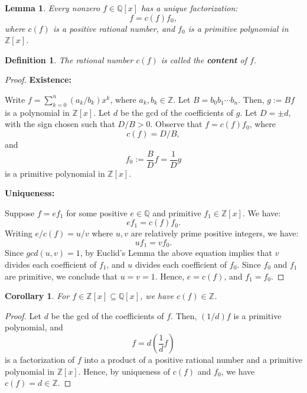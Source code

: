 \documentclass[a4paper,12pt]{report}
\newcounter{statement}
\numberwithin{statement}{chapter}
\newtheorem{defn}[statement]{Definition}
\newtheorem{lemma}[statement]{Lemma}
\newtheorem{cor}[statement]{Corollary}
\numberwithin{equation}{chapter}
\numberwithin{section}{chapter}
\numberwithin{subsection}{section}
\begin{document}
\begin{lemma}
Every nonzero $f \in \mathbb{Q}[x]$ has a unique factorization:
\[
f = c(f) f_0,
\]
where $c(f)$ is a positive rational number, and $f_0$ is a primitive polynomial in $\mathbb{Z}[x]$.
\end{lemma}
\begin{defn}

The rational number $c(f)$ is called the  {\bf content}  of $f$.

\end{defn}
\begin{proof}

 {\bf Existence:} 

Write $f = \sum_{k = 0}^n (a_k/b_k)x^k$,
where $a_k, b_k \in \mathbb{Z}$.
Let $B = b_0b_1\cdots b_n$.
Then, $g := Bf$ is a polynomial in $\mathbb{Z}[x]$.
Let $d$ be the gcd of the coefficients of $g$.
Let $D = \pm d$, with the sign chosen such that $D/B > 0$.
Observe that $f = c(f)f_0$, where
\[
c(f) = D/B,
\]
and
\[
f_0 := \frac{B}{D} f = \frac{1}{D}g
\]
is a primitive polynomial in $\mathbb{Z}[x]$.


 {\bf Uniqueness:} 

Suppose $f = ef_1$ for some positive $e \in \mathbb{Q}$ and primitive $f_1 \in \mathbb{Z}[x]$.
We have:
\[
ef_1 = c(f) f_0.
\]
Writing $e/c(f) = u/v$ where $u, v$ are relatively prime positive integers, we have:
\[
uf_1 = vf_0.
\]
Since $gcd(u, v) = 1$, by Euclid's Lemma the above equation implies that $v$ divides each
coefficient of $f_1$, and $u$ divides each coefficient of $f_0$.
Since $f_0$ and $f_1$ are primitive, we conclude that $u = v = 1$.
Hence, $e = c(f)$, and $f_1 = f_0$.


\end{proof}







\begin{cor}
For $f \in \mathbb{Z}[x] \subseteq \mathbb{Q}[x]$, we have $c(f) \in \mathbb{Z}$.
\end{cor}
\begin{proof}

Let $d$ be the gcd of the coefficients of $f$.  Then, $(1/d)f$
is a primitive polynomial, and
\[
f = d\left(\frac{1}{d} f \right)
\]
is a factorization of $f$ into a product of a positive rational number and a primitive polynomial
in $\mathbb{Z}[x]$.
Hence, by uniqueness of $c(f)$ and $f_0$, we have $c(f) = d \in \mathbb{Z}$.


\end{proof}
\end{document}
